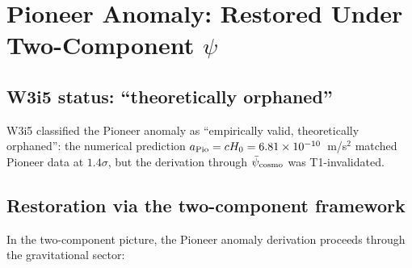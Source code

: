 \documentclass[11pt]{article}
\newcommand{\ee}[1]{\times 10^{#1}}
\newcommand{\psicosmo}{\bar{\psi}_{\rm cosmo}}
\newcommand{\Hzero}{H_0}
\begin{document}
\section{Pioneer Anomaly: Restored Under Two-Component $\psi$}
\label{sec:Pioneer-restored}

\subsection{W3i5 status: ``theoretically orphaned''}

W3i5 classified the Pioneer anomaly as ``empirically valid, theoretically
orphaned'': the numerical prediction $a_{\rm Pio} = c\Hzero = 6.81\ee{-10}$~m/s$^2$
matched Pioneer data at $1.4\sigma$, but the derivation through $\psicosmo$
was T1-invalidated.

\subsection{Restoration via the two-component framework}

In the two-component picture, the Pioneer anomaly derivation proceeds
through the gravitational sector:
\end{document}
